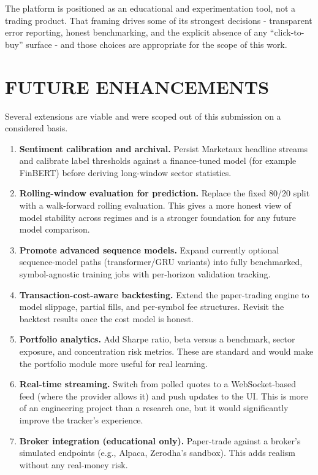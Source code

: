\documentclass[12pt,a4paper]{report}
\numberwithin{equation}{chapter}
\begin{document}
The platform is positioned as an educational and experimentation tool, not a trading product. That framing drives some of its strongest decisions - transparent error reporting, honest benchmarking, and the explicit absence of any ``click-to-buy'' surface - and those choices are appropriate for the scope of this work.

\section{FUTURE ENHANCEMENTS}

Several extensions are viable and were scoped out of this submission on a considered basis.

\begin{enumerate}
  \item \textbf{Sentiment calibration and archival.} Persist Marketaux headline streams and calibrate label thresholds against a finance-tuned model (for example FinBERT) before deriving long-window sector statistics.
  \item \textbf{Rolling-window evaluation for prediction.} Replace the fixed 80/20 split with a walk-forward rolling evaluation. This gives a more honest view of model stability across regimes and is a stronger foundation for any future model comparison.
  \item \textbf{Promote advanced sequence models.} Expand currently optional sequence-model paths (transformer/GRU variants) into fully benchmarked, symbol-agnostic training jobs with per-horizon validation tracking.
  \item \textbf{Transaction-cost-aware backtesting.} Extend the paper-trading engine to model slippage, partial fills, and per-symbol fee structures. Revisit the backtest results once the cost model is honest.
  \item \textbf{Portfolio analytics.} Add Sharpe ratio, beta versus a benchmark, sector exposure, and concentration risk metrics. These are standard and would make the portfolio module more useful for real learning.
  \item \textbf{Real-time streaming.} Switch from polled quotes to a WebSocket-based feed (where the provider allows it) and push updates to the UI. This is more of an engineering project than a research one, but it would significantly improve the tracker's experience.
  \item \textbf{Broker integration (educational only).} Paper-trade against a broker's simulated endpoints (e.g., Alpaca, Zerodha's sandbox). This adds realism without any real-money risk.

\end{enumerate}
\end{document}
